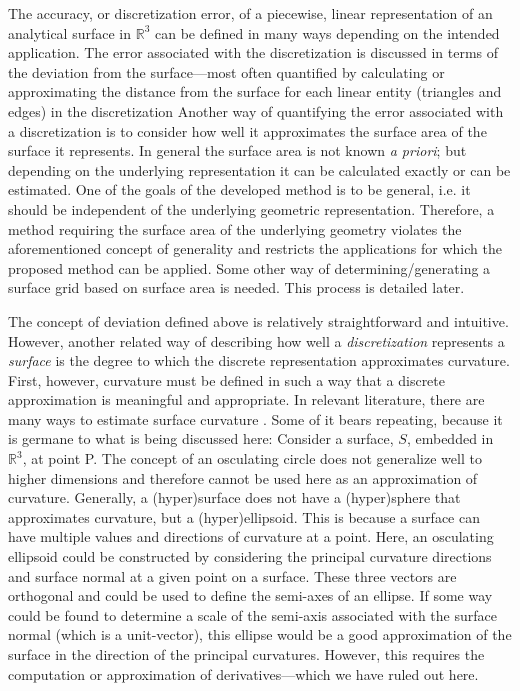The accuracy, or discretization error, of a piecewise, linear
representation of an analytical surface in ${\mathbb R}^3$ can be
defined in many ways depending on the intended application. The error
associated with the discretization is discussed in terms of the
deviation from the surface---most often quantified by calculating or
approximating the distance from the surface for each linear entity
(triangles and edges) in the discretization Another way of quantifying
the error associated with a discretization is to consider how well
it approximates the surface area of the surface it represents. In
general the surface area is not known {\it a priori}; but depending on
the underlying representation it can be calculated exactly or can be
estimated. One of the goals of the developed method is to be general,
i.e. it should be independent of the underlying geometric
representation. Therefore, a method requiring the surface area of the
underlying geometry violates the aforementioned concept of generality
and restricts the applications for which the proposed method can be
applied. Some other way of determining/generating a surface grid based
on surface area is needed. This process is detailed later.

The concept of deviation defined above is relatively straightforward and
intuitive. However, another related way of describing how well a
\textit{discretization} represents a \textit{surface} is the degree to
which the discrete representation approximates curvature. First,
however, curvature must be defined in such a way that a discrete
approximation is meaningful and appropriate. In relevant literature,
there are many ways to estimate surface curvature \cite{hermann07}. Some
of it bears repeating, because it is germane to what is being discussed
here: Consider a surface, $S$, embedded in ${\mathbb R}^3$, at point P.
The concept of an osculating circle \cite{weissteineOsculatingCircle}
does not generalize well to higher dimensions and therefore cannot be
used here as an approximation of curvature. Generally, a (hyper)surface
does not have a (hyper)sphere that approximates curvature, but a
(hyper)ellipsoid. This is because a surface can have multiple values and
directions of curvature at a point. Here, an osculating ellipsoid could
be constructed by considering the principal curvature directions and
surface normal at a given point on a surface. These three vectors are
orthogonal and could be used to define the semi-axes of an ellipse. If
some way could be found to determine a scale of the semi-axis associated
with the surface normal (which is a unit-vector), this ellipse would be
a good approximation of the surface in the direction of the principal
curvatures. However, this requires the computation or approximation of
derivatives---which we have ruled out here.

